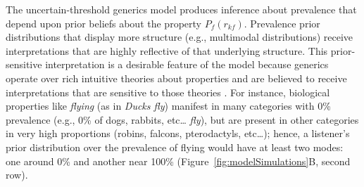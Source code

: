 \documentclass[floatsintext,man]{apa6}
\let\rmarkdownfootnote\footnote%
\def\footnote{\protect\rmarkdownfootnote}
\begin{document}



 
 The uncertain-threshold generics model produces inference about prevalence that depend upon prior beliefs about the property $P_f(r_{kf})$. 
 Prevalence prior distributions that display more structure (e.g., multimodal distributions) receive interpretations that are highly reflective of that underlying structure.
 This prior-sensitive interpretation is a desirable feature of the model because generics operate over rich intuitive theories about properties and are believed to receive interpretations that are sensitive to those theories \cite{Leslie2007, Gelman2010:essentialist, Cimpian2010theory, Rhodes2012, Prasada2013}. 
 For instance, biological properties like \emph{flying} (as in \emph{Ducks fly}) manifest in many categories with 0\% prevalence (e.g., 0\% of dogs, rabbits, etc\ldots{} \emph{fly}), but are present in other categories in very high proportions (robins, falcons, pterodactyls, etc\ldots{}); hence, a listener's prior distribution over the prevalence of flying would have at least two modes: one around 0\% and another near 100\% (Figure~\ref{fig:modelSimulations}B, second row).
\end{document}
